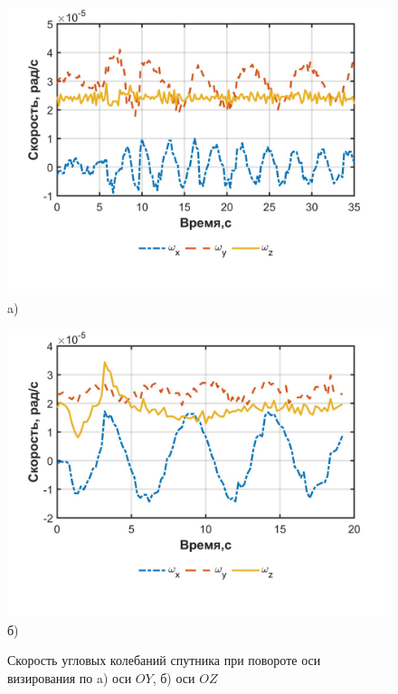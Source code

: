  \begin{figure}[h!]
 	\begin{minipage}[b][][b]{0.49\linewidth}\centering
 		\includegraphics[width=1\linewidth]{matlab/img/sat_gyro_dataY.jpg} \\ a)
 	\end{minipage}
 	\hfill
 	\begin{minipage}[b][][b]{0.49\linewidth}\centering
 		\includegraphics[width=1\linewidth]{matlab/img/sat_gyro_dataZ.jpg} \\ б)
 	\end{minipage}
 	\caption{Скорость угловых колебаний спутника при повороте оси визирования по a) оси $OY$, б) оси $OZ$ }
 	\label{fig:rotationYZ}
 \end{figure}
 
